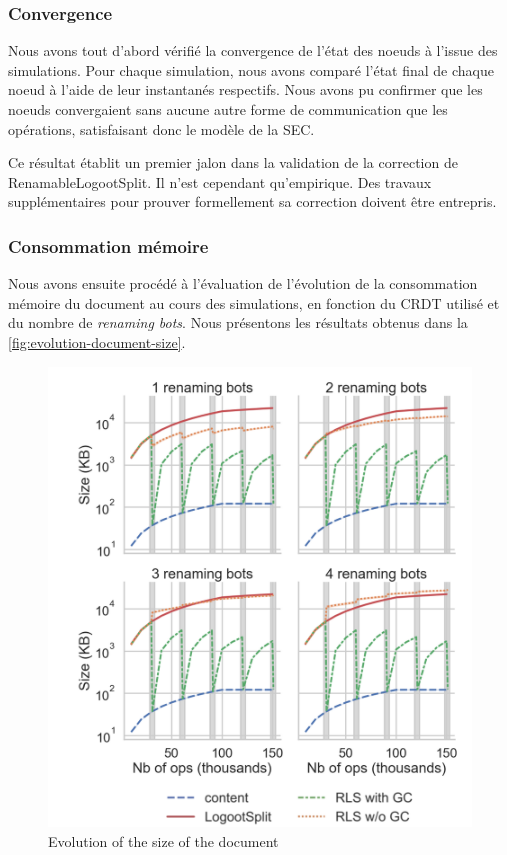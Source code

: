 \documentclass[12pt]{thesul}
\begin{document}
\subsubsection{Convergence}

Nous avons tout d'abord vérifié la convergence de l'état des noeuds à l'issue des simulations.
Pour chaque simulation, nous avons comparé l'état final de chaque noeud à l'aide de leur instantanés respectifs.
Nous avons pu confirmer que les noeuds convergaient sans aucune autre forme de communication que les opérations, satisfaisant donc le modèle de la \ac{SEC}.

Ce résultat établit un premier jalon dans la validation de la correction de RenamableLogootSplit.
Il n'est cependant qu'empirique.
Des travaux supplémentaires pour prouver formellement sa correction doivent être entrepris.

\subsubsection{Consommation mémoire}

Nous avons ensuite procédé à l'évaluation de l'évolution de la consommation mémoire du document au cours des simulations, en fonction du \ac{CRDT} utilisé et du nombre de \emph{renaming bots}.
Nous présentons les résultats obtenus dans la \autoref{fig:evolution-document-size}.

\begin{figure}[!ht]
  \centering
  \includegraphics[width=0.7\columnwidth]{img/snapshot-sizes-alt-legende-v2.png}
  \caption{Evolution of the size of the document}
  \label{fig:evolution-document-size}
\end{figure}
\end{document}
